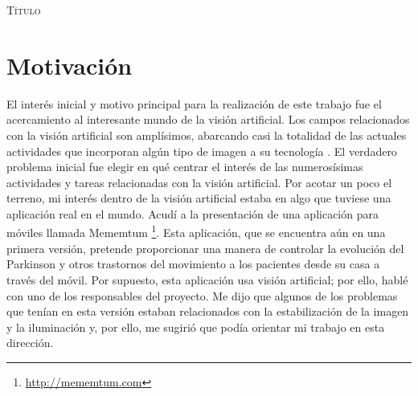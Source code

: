 \documentclass[a4paper,openright, 12pt]{book}
\begin{document}
\begin{titlepage}
\begin{center}
\begin{Huge}
\textsc{Título}
\end{Huge}
\end{center}
\end{titlepage}

\newpage
\mbox{}
\thispagestyle{empty} 


\tableofcontents %
\newpage
\thispagestyle{empty}


\chapter*{Motivación}\label{cap.introduccion}
%

El interés inicial y motivo principal para la realización de este trabajo fue el acercamiento al interesante mundo de la visión artificial. Los campos relacionados con la visión artificial son amplísimos, abarcando casi la totalidad de las actuales actividades que incorporan algún tipo de imagen a su tecnología . El verdadero problema inicial fue elegir en qué centrar el interés de las numerosísimas actividades y tareas relacionadas con la visión artificial. Por acotar un poco el terreno, mi interés dentro de la visión artificial estaba en algo que tuviese una aplicación real en el mundo. Acudí a la presentación de una aplicación para móviles llamada Mememtum \footnote{\url{http://mememtum.com}}. Esta aplicación, que se encuentra aún en una primera versión, pretende proporcionar una manera de controlar la evolución del Parkinson y otros trastornos del movimiento a los pacientes desde su casa a través del móvil. Por supuesto, esta aplicación usa visión artificial; por ello, hablé con uno de los responsables del proyecto. Me dijo que algunos de los problemas que tenían en esta versión estaban relacionados con la estabilización de la imagen y la iluminación y, por ello, me sugirió que podía orientar mi trabajo en esta dirección.
\end{document}
